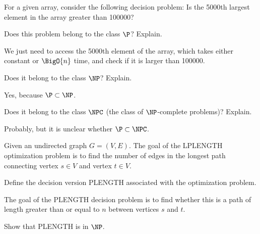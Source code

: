 \documentclass[12pt,letterpaper,twoside]{hmcpset}
\begin{document}
\begin{problem}[1]
 For a given array, consider the following decision problem:  Is the 5000th largest element in the array greater than 100000?
\end{problem}

\begin{problem}[1a]
 Does this problem belong to the class $\P$? Explain.
\end{problem}

\begin{solution}
 We just need to access the 5000th element of the array, which takes either constant or $\BigO{n}$ time, and check if it is larger than 100000.
\end{solution}

\begin{problem}[1b]
 Does it belong to the class $\NP$? Explain.
\end{problem}

\begin{solution}
 Yes, because $\P \subset \NP$.
\end{solution}

\begin{problem}[1c]
 Does it belong to the class $\NPC$ (the class of $\NP$-complete problems)? Explain.
\end{problem}

\begin{solution}
Probably, but it is unclear whether $\P \subset \NPC$. 
\end{solution}

\begin{problem}[2]
 Given an undirected graph $G=(V,E)$. The goal of the LPLENGTH optimization problem is to find the number of edges in the longest path connecting vertex $s\in V$ and vertex $t\in V$.
\end{problem}

\begin{problem}[2a]
 Define the decision version PLENGTH associated with the optimization problem.
\end{problem}

\begin{solution}
 The goal of the PLENGTH decision problem is to find whether this is a path of length greater than or equal to $n$ between vertices \(s\) and \(t\).
\end{solution}

\begin{problem}[2b]
 Show that PLENGTH is in $\NP$.
\end{problem}
\end{document}
